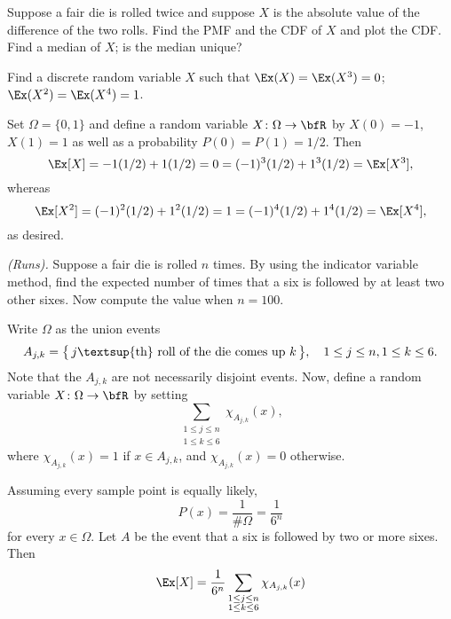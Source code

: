 \begin{problem}[Handout 6, \# 5]
  Suppose a fair die is rolled twice and suppose \(X\) is the absolute
  value of the difference of the two rolls. Find the PMF and the CDF of
  \(X\) and plot the CDF. Find a median of \(X\); is the median unique?
\end{problem}
\begin{solution}

\end{solution}
\newpage

\begin{problem}[Handout 6, \# 7]
  Find a discrete random variable \(X\) such that \(\Ex(X)=\Ex(X^3)=0\);
  \(\Ex(X^2)=\Ex(X^4)=1\).
\end{problem}
\begin{solution}
  Set \(\Omega=\{0,1\}\) and define a random variable
  \(X\colon\Omega\to\bfR\) by \(X(0)= -1\), \(X(1)= 1\) as well as a
  probability \(P(0)=P(1)=1/2\). Then
  \[
    \Ex[X]=-1(1/2)+1(1/2)=0=(-1)^3(1/2)+1^3(1/2)=\Ex[X^3],
  \]
  whereas
  \[
    \Ex[X^2]=(-1)^2(1/2)+1^2(1/2)=1=(-1)^4(1/2)+1^4(1/2)=\Ex[X^4],
  \]
  as desired.
\end{solution}
\newpage

\begin{problem}[Handout 6, \# 9]
  \emph{(Runs).} Suppose a fair die is rolled \(n\) times. By using the
  indicator variable method, find the expected number of times that a six
  is followed by at least two other sixes. Now compute the value when
  \(n=100\).
\end{problem}
\begin{solution}
  Write \(\Omega\) as the union events
  \[
    A_{j,k}
    =\bigl\{\,
    \text{\(j\)\textsup{th} roll of the die comes up \(k\)}
    \,\bigr\},%
    \quad%
    1\leq j\leq n,1\leq k\leq 6.
  \]
  Note that the \(A_{j,k}\) are not necessarily disjoint events. Now,
  define a random variable \(X\colon\Omega\to\bfR\) by setting
  \[
    \sum_{\substack{1\leq j\leq n\\ 1\leq k\leq 6}}\chi_{A_{j,k}}(x),
  \]
  where \(\chi_{A_{j,k}}(x)=1\) if \(x\in A_{j,k}\), and
  \(\chi_{A_{j,k}}(x)=0\) otherwise.

  Assuming every sample point is equally likely,
  \[
    P(x)=\frac{1}{\#\Omega}=\frac{1}{6^n}
  \]
  for every \(x\in\Omega\). Let \(A\) be the event that a six is followed
  by two or more sixes. Then
  \[
    \Ex[X]=\frac{1}{6^n} \sum_{\substack{1\leq j\leq n\\ 1\leq k\leq
        6}}\chi_{A_{j,k}}(x)
  \]
\end{solution}
\newpage

